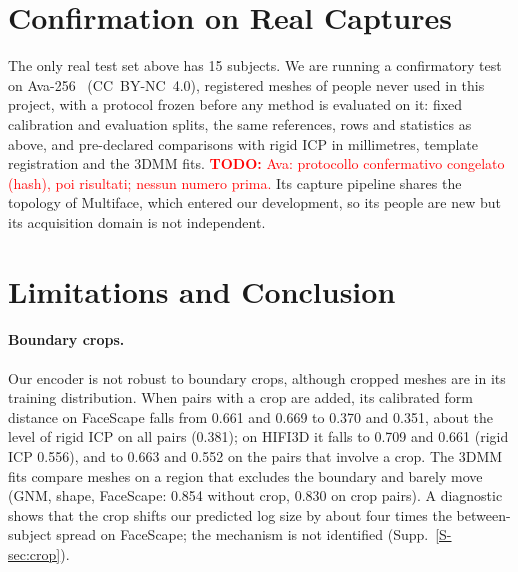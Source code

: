 \documentclass[10pt,twocolumn,letterpaper]{article}
\newcommand{\todo}[1]{\textcolor{red}{\textbf{TODO:} #1}}
\begin{document}
\section{Confirmation on Real Captures}
\label{sec:ava}
The only real test set above has 15 subjects. We are running a confirmatory test on Ava-256~\cite{martinez2024ava256} (CC~BY-NC~4.0), registered meshes of people never used in this project, with a protocol frozen before any method is evaluated on it: fixed calibration and evaluation splits, the same references, rows and statistics as above, and pre-declared comparisons with rigid ICP in millimetres, template registration and the 3DMM fits. \todo{Ava: protocollo confermativo congelato (hash), poi risultati; nessun numero prima.} Its capture pipeline shares the topology of Multiface, which entered our development, so its people are new but its acquisition domain is not independent.

\section{Limitations and Conclusion}
\label{sec:limitations}

\paragraph{Boundary crops.} Our encoder is not robust to boundary crops, although cropped meshes are in its training distribution. When pairs with a crop are added, its calibrated form distance on FaceScape falls from 0.661 and 0.669 to 0.370 and 0.351, about the level of rigid ICP on all pairs (0.381); on HIFI3D it falls to 0.709 and 0.661 (rigid ICP 0.556), and to 0.663 and 0.552 on the pairs that involve a crop. The 3DMM fits compare meshes on a region that excludes the boundary and barely move (GNM, shape, FaceScape: 0.854 without crop, 0.830 on crop pairs). A diagnostic shows that the crop shifts our predicted log size by about four times the between-subject spread on FaceScape; the mechanism is not identified (Supp.~\ref{S-sec:crop}).
\end{document}
